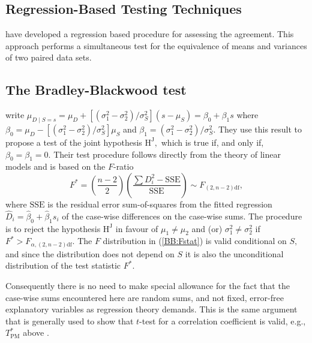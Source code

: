 \documentclass[12pt, a4paper]{report}
\theoremstyle{plain}
\theoremstyle{definition}
\theoremstyle{remark}
\begin{document}
\subsection{Regression-Based Testing Techniques}

\citet{BB89} have developed a regression based procedure for
assessing the agreement. This approach performs a simultaneous test for the equivalence of
means and variances of two paired data sets. 

\subsection{The Bradley-Blackwood test}

\cite{BB89} write $\mu_{D \mid S=s} = \mu_D + [ ( \sigma^2_1 - \sigma^2_2) / \sigma^2_S ] (s - \mu_S) = \beta_0 + \beta_1 s$ where $\beta_0=\mu_D- [(\sigma^2_1-\sigma^2_2)/ \sigma^2_S] \mu_S$ and $\beta_1 = (\sigma^2_1 - \sigma^2_2 )/ \sigma^2_S.$ They use this result to propose a test of the joint hypothesis $\textrm{H}^\mathrm{J},$ which is true if, and only if, $\beta_0=\beta_1=0.$ Their test procedure follows directly from the theory of linear models \citep[for example]{Hogg} and is based on the $F$-ratio
\begin{equation}\label{BB:Fstat}
F^* = (\frac{n-2}{2}) (\frac{\sum {D_i^2} - \mathrm{SSE}}{\mathrm{SSE}}) \sim F_{(2,n-2)\textrm{df}} ,
\end{equation}
where $\mathrm{SSE}$ is the residual error sum-of-squares from the fitted regression $\hat{D}_i=\hat{\beta}_0 +\hat{\beta}_1 s_i$ of the case-wise differences on the case-wise sums. The procedure is to reject the hypothesis $\textrm{H}^\mathrm{J}$ in favour of $\mu_1\neq\mu_2$ and (or) $\sigma^2_1\neq\sigma^2_2$ if $F^* >  F_{\alpha,(2,n-2)\textrm{df}}.$ The $F$ distribution in (\ref{BB:Fstat}) is valid conditional on $S,$ and since the distribution does not depend on $S$ it is also the unconditional distribution of the test statistic $F^*.$ 

Consequently there is no need to make special allowance for the fact that the case-wise sums encountered here are random sums, and not fixed, error-free explanatory variables as regression theory demands. This is the same argument that is generally used to show that $t$-test for a correlation coefficient is valid, e.g., $T^*_\mathrm{PM}$ above \citep[page 499]{Hogg}.
\end{document}
